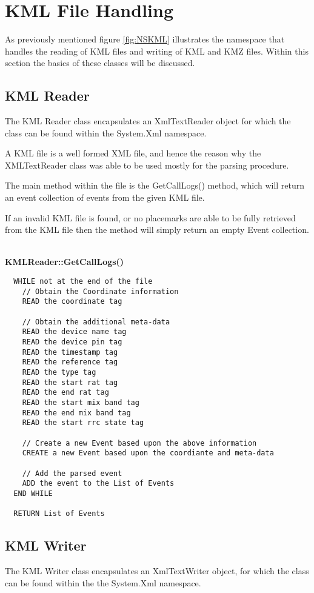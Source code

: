 \section{KML File Handling}

As previously mentioned figure \ref{fig:NSKML} illustrates the namespace that 
handles the reading of KML files and writing of KML and KMZ files. Within this 
section the basics of these classes will be discussed.

\subsection{KML Reader}
The KML Reader class encapsulates an XmlTextReader object for which the class 
can be found within the {\ttfamily System.Xml} namespace. 

A KML file is a well formed XML file, and hence the reason why the 
{\ttfamily XMLTextReader} class was able to be used mostly for the parsing 
procedure.

The main method within the file is the {\ttfamily GetCallLogs()} method, which
will return an event collection of events from the given KML file. 

If an invalid KML file is found, or no placemarks are able to be fully 
retrieved from the KML file then the method will simply return an empty Event 
collection.

~\\
{\bfseries KMLReader::GetCallLogs()}
\lstset{style=pseudocode}
\begin{lstlisting}
  WHILE not at the end of the file
    // Obtain the Coordinate information
    READ the coordinate tag

    // Obtain the additional meta-data
    READ the device name tag
    READ the device pin tag
    READ the timestamp tag
    READ the reference tag
    READ the type tag
    READ the start rat tag
    READ the end rat tag
    READ the start mix band tag
    READ the end mix band tag
    READ the start rrc state tag

    // Create a new Event based upon the above information
    CREATE a new Event based upon the coordiante and meta-data

    // Add the parsed event
    ADD the event to the List of Events
  END WHILE

  RETURN List of Events
\end{lstlisting}


\subsection{KML Writer}
The KML Writer class encapsulates an {\ttfamily XmlTextWriter} object, for 
which the class can be found within the the {\ttfamily System.Xml} namespace. 

